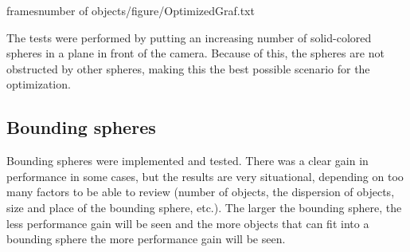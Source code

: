 			\begin{table}
			\centering
				{frames}{number of objects}{/figure/OptimizedGraf.txt}
			\end{table}

			The tests were performed by putting an increasing number of
			solid-colored spheres in a plane in front of the camera. Because of
			this, the spheres are not obstructed by other spheres, making this
			the best possible scenario for the optimization.

		\subsection{Bounding spheres}

			Bounding spheres were implemented and tested. There was a clear
			gain in performance in some cases, but the results are very
			situational, depending on too many factors to be able to review
			(number of objects, the dispersion of objects, size and place of
			the bounding sphere, etc.).  The larger the bounding sphere, the
			less performance gain will be seen and the more objects that can
			fit into a bounding sphere the more performance gain will be seen. 
